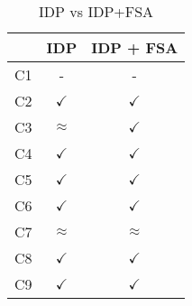 \begin{table}[]
\centering
\caption{IDP vs IDP+FSA}
\label{criteria}
\begin{tabular}{|l|c|c|}
\hline
 & IDP & IDP + FSA \\ \hline
C1 & - & - \\ \hline
C2 & $\checkmark$ & $\checkmark$ \\ \hline
C3 & $\approx$ & $\checkmark$ \\ \hline
C4 & $\checkmark$ & $\checkmark$ \\ \hline
C5 & $\checkmark$ & $\checkmark$ \\ \hline
C6 & $\checkmark$ & $\checkmark$ \\ \hline
C7 & $\approx$ & $\approx$ \\ \hline
C8 & $\checkmark$ & $\checkmark$ \\ \hline
C9 & $\checkmark$ & $\checkmark$ \\ \hline
\end{tabular}
\end{table}
